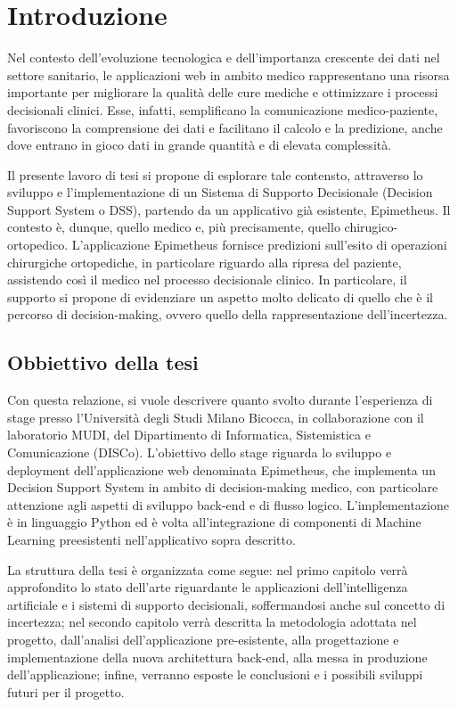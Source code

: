\chapter*{Introduzione}
\label{ch:introduzione}

Nel contesto dell'evoluzione tecnologica e dell'importanza crescente dei dati nel settore sanitario, le applicazioni web in ambito medico rappresentano una risorsa importante per migliorare la qualità delle cure mediche e ottimizzare i processi decisionali clinici.
Esse, infatti, semplificano la comunicazione medico-paziente, favoriscono la comprensione dei dati e facilitano il calcolo e la predizione, anche dove entrano in gioco dati in grande quantità e di elevata complessità.

Il presente lavoro di tesi si propone di esplorare tale contensto, attraverso lo sviluppo e l’implementazione di un Sistema di Supporto Decisionale (Decision Support System o DSS), partendo da un applicativo già esistente, Epimetheus.
\newline
Il contesto è, dunque, quello medico e, più precisamente, quello chirugico-ortopedico.
\newline
L'applicazione Epimetheus fornisce predizioni sull'esito di operazioni chirurgiche ortopediche, in particolare riguardo alla ripresa del paziente, assistendo così il medico nel processo decisionale clinico.
In particolare, il supporto si propone di evidenziare un aspetto molto delicato di quello che è il percorso di decision-making, ovvero quello della rappresentazione dell’incertezza.

\section*{Obbiettivo della tesi}
\label{sec:obbiettivo}
Con questa relazione, si vuole descrivere quanto svolto durante l’esperienza di stage presso l’Università degli Studi Milano Bicocca, in collaborazione con il laboratorio MUDI, del Dipartimento di Informatica, Sistemistica e Comunicazione (DISCo).
\newline
L'obiettivo dello stage riguarda lo sviluppo e deployment dell’applicazione web denominata Epimetheus, che implementa un Decision Support System in ambito di decision-making medico, con particolare attenzione agli aspetti di sviluppo back-end e di flusso logico. L'implementazione è in linguaggio Python ed è volta all'integrazione di componenti di Machine Learning preesistenti nell'applicativo sopra descritto.

La struttura della tesi è organizzata come segue: nel primo capitolo verrà approfondito lo stato dell'arte riguardante le applicazioni dell'intelligenza artificiale e i sistemi di supporto decisionali, soffermandosi anche sul concetto di incertezza; nel secondo capitolo verrà descritta la metodologia adottata nel progetto, dall’analisi dell’applicazione pre-esistente, alla progettazione e implementazione della nuova architettura back-end, alla messa in produzione dell’applicazione; infine, verranno esposte le conclusioni e i possibili sviluppi futuri per il progetto.